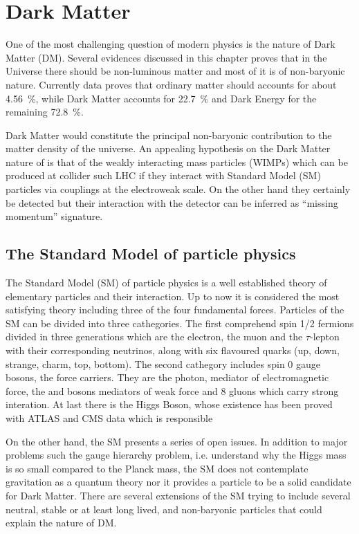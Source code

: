 \chapter{Dark Matter}
\lettrine{O}{}ne of the most challenging question of modern physics is the nature of Dark Matter (DM). Several evidences discussed in this chapter proves that in the Universe there should be non-luminous matter and most of it is of non-baryonic nature. Currently data proves that ordinary matter should accounts for about \SI{4.56}{\percent}, while Dark Matter accounts for \SI{22.7}{\percent} and Dark Energy for the remaining \SI{72.8}{\percent}.

Dark Matter would constitute the principal non-baryonic contribution to the matter density of the universe. An appealing hypothesis on the Dark Matter nature of is that of the weakly interacting mass particles (WIMPs) which can be produced at collider such LHC if they interact with Standard Model (SM) particles via couplings at the electroweak scale. On the other hand they certainly be detected but their interaction with the detector can be inferred as ``missing momentum'' signature. 

\section{The Standard Model of particle physics}
The Standard Model (SM) of particle physics is a well established theory of elementary particles and their interaction. Up to now it is considered the most satisfying theory including three of the four fundamental forces.
Particles of the SM can be divided into three cathegories. The first comprehend spin \num{1/2} fermions divided in three generations which are the electron, the muon and the $\tau$-lepton with their corresponding neutrinos, along with six flavoured quarks (up, down, strange, charm, top, bottom). The second cathegory includes spin 0 gauge bosons, the force carriers. They are the photon, mediator of electromagnetic force, the \Zboson and \Wboson bosons mediators of weak force and 8 gluons which carry strong interation. At last there is the Higgs Boson, whose existence has been proved with \RunOne ATLAS and CMS data which is responsible 

On the other hand, the SM presents a series of open issues. In addition to major problems such the gauge hierarchy problem, i.e. understand why the Higgs mass is so small compared to the Planck mass, the SM does not contemplate gravitation as a quantum theory nor it provides a particle to be a solid candidate for Dark Matter. There are several extensions of the SM trying to include several neutral, stable or at least long lived, and non-baryonic particles that could explain the nature of DM.

